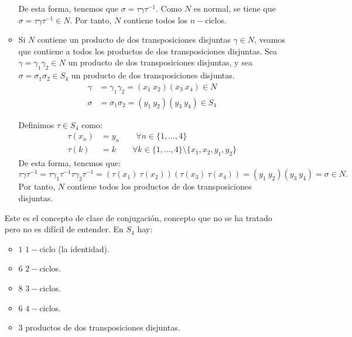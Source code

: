 \begin{ejercicio}
\begin{enumerate}
\begin{itemize}
            De esta forma, tenemos que $\sigma=\tau\gamma\tau^{-1}$. Como $N$ es normal, se tiene que $\sigma=\tau\gamma\tau^{-1}\in N$. Por tanto, $N$ contiene todos los $n-$ciclos.

            \item Si $N$ contiene un producto de dos transposiciones disjuntas $\gamma\in N$, veamos que contiene a todos los productos de dos transposiciones disjuntas. Sea $\gamma=\gamma_1\gamma_2\in N$ un producto de dos transposiciones disjuntas, y sea $\sigma=\sigma_1\sigma_2\in S_4$ un producto de dos transposiciones disjuntas.
            \begin{align*}
                \gamma &= \gamma_1\gamma_2=(x_1\ x_2)(x_3\ x_4)\in N \\
                \sigma &= \sigma_1\sigma_2=(y_1\ y_2)(y_3\ y_4)\in S_4
            \end{align*}
            
            Definimos $\tau\in S_4$ como:
            \begin{align*}
                \tau(x_n) &= y_n\qquad \forall n\in \{1,\ldots,4\} \\
                \tau(k) &= k\qquad \forall k\in \{1,\ldots,4\}\setminus\{x_1,x_2,y_1,y_2\}
            \end{align*}
            De esta forma, tenemos que:
            \begin{equation*}
                \tau\gamma\tau^{-1} = \tau\gamma_1\tau^{-1}\tau\gamma_2\tau^{-1} = (\tau(x_1)\ \tau(x_2))(\tau(x_3)\ \tau(x_4)) = (y_1\ y_2)(y_3\ y_4)=\sigma\in N.
            \end{equation*}
            Por tanto, $N$ contiene todos los productos de dos transposiciones disjuntas.
        \end{itemize}
        Este es el concepto de clase de conjugación, concepto que no se ha tratado pero no es difícil de entender. En $S_4$ hay:
        \begin{itemize}
            \item $1$ $1-$ciclo (la identidad).
            \item $6$ $2-$ciclos.
            \item $8$ $3-$ciclos.
            \item $6$ $4-$ciclos.
            \item $3$ productos de dos transposiciones disjuntas.
        \end{itemize}


\end{enumerate}
\end{ejercicio}
